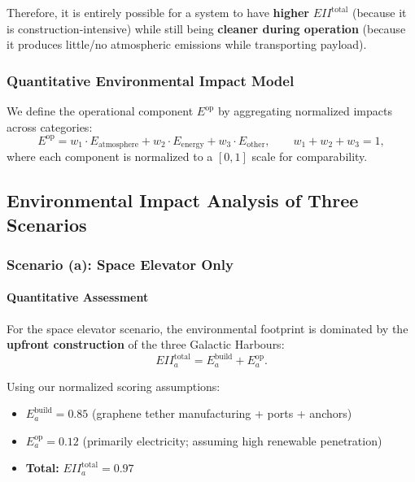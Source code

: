 \documentclass{mcmthesis}
\begin{document}
Therefore, it is entirely possible for a system to have \textbf{higher} $EII^{\text{total}}$ (because it is construction-intensive)
while still being \textbf{cleaner during operation} (because it produces little/no atmospheric emissions while transporting payload).

\subsubsection{Quantitative Environmental Impact Model}

We define the operational component $E^{\text{op}}$ by aggregating normalized impacts across categories:
\begin{equation}
    E^{\text{op}} = w_1 \cdot E_{\text{atmosphere}} + w_2 \cdot E_{\text{energy}} + w_3 \cdot E_{\text{other}},
    \qquad
    w_1+w_2+w_3=1,
\end{equation}
where each component is normalized to a $[0,1]$ scale for comparability.

\subsection{Environmental Impact Analysis of Three Scenarios}

\subsubsection{Scenario (a): Space Elevator Only}

\paragraph{Quantitative Assessment}

For the space elevator scenario, the environmental footprint is dominated by the \textbf{upfront construction} of the three Galactic Harbours:
\begin{equation}
    EII_a^{\text{total}} = E_a^{\text{build}} + E_a^{\text{op}}.
\end{equation}

Using our normalized scoring assumptions:
\begin{itemize}
    \item $E_a^{\text{build}} = 0.85$ \quad (graphene tether manufacturing + ports + anchors)
    \item $E_a^{\text{op}} = 0.12$ \quad (primarily electricity; assuming high renewable penetration)
    \item \textbf{Total:} $EII_a^{\text{total}} = 0.97$
\end{itemize}
\end{document}
